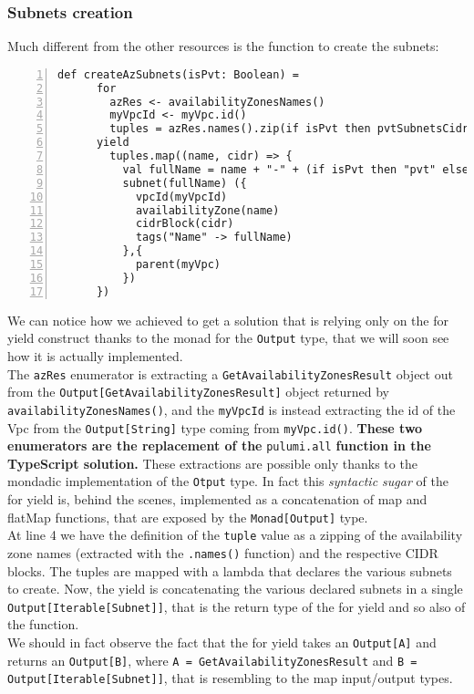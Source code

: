 \subsubsection{Subnets creation}
\label{sssec:subnets-creation}
Much different from the other resources is the function to create the subnets:\\
\begin{minipage}{\linewidth}
\begin{lstlisting}[numbers=left, numberstyle=\tiny, numbersep=-5pt, stepnumber=1,linewidth=420pt]
  def createAzSubnets(isPvt: Boolean) =
      for
        azRes <- availabilityZonesNames()
        myVpcId <- myVpc.id()
        tuples = azRes.names().zip(if isPvt then pvtSubnetsCidrs else pubSubnetsCidrs)
      yield
        tuples.map((name, cidr) => {
          val fullName = name + "-" + (if isPvt then "pvt" else "pub") + "-subnet-scala"
          subnet(fullName) ({
            vpcId(myVpcId)
            availabilityZone(name)
            cidrBlock(cidr)
            tags("Name" -> fullName)
          },{
            parent(myVpc)
          })
      })
\end{lstlisting}
\end{minipage}
We can notice how we achieved to get a solution that is relying only on the for yield construct thanks to the monad for the \texttt{Output} type, that we will soon see how it is actually implemented.\\
The \texttt{azRes} enumerator is extracting a \texttt{GetAvailabilityZonesResult} object out from the \texttt{Output[GetAvailabilityZonesResult]} object returned by \texttt{availabilityZonesNames()}, 
and the \texttt{myVpcId} is instead extracting the id of the Vpc from the \texttt{Output[String]} type coming from \texttt{myVpc.id()}.
\textbf{These two enumerators are the replacement of the} \texttt{pulumi.all} \textbf{function in the TypeScript solution.}
These extractions are possible only thanks to the mondadic implementation of the \texttt{Otput} type. 
In fact this \textit{syntactic sugar} of the for yield is, behind the scenes, implemented as a concatenation of map and flatMap functions, that are exposed by the \texttt{Monad[Output]} type.\\
At line 4 we have the definition of the \texttt{tuple} value as a zipping of the availability zone names (extracted with the \texttt{.names()} function) and the respective CIDR blocks.
The tuples are mapped with a lambda that declares the various subnets to create.
Now, the yield is concatenating the various declared subnets in a single \texttt{Output[Iterable[Subnet]]}, that is the return type of the for yield and so also of the function.\\
We should in fact observe the fact that the for yield takes an \texttt{Output[A]} and returns an \texttt{Output[B]}, where \texttt{A = GetAvailabilityZonesResult} and \texttt{B = Output[Iterable[Subnet]]}, that is resembling to the map input/output types.


